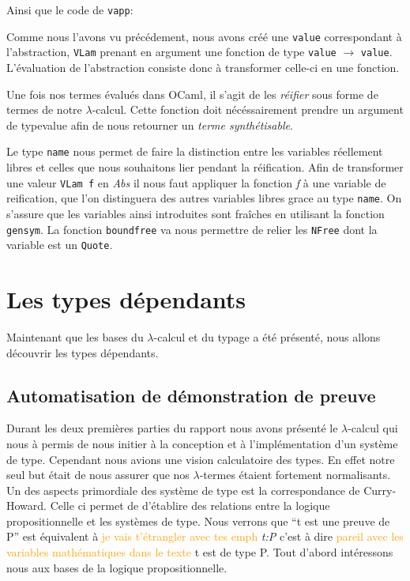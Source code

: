 \documentclass {article}
\newcommand{\codefrom}[3]
           {}
\theoremstyle{definition}
\theoremstyle{remark}
\newcommand{\attention}[1]{\textcolor{orange}{#1}}
\newcommand{\fun}[1]{\lstinline!#1!}
\begin{document}
\codefrom{typed}{lambda}{big_step_eval_exTm_app}
Ainsi que le code de \fun{vapp}: 
\codefrom{typed}{lambda}{vapp}

Comme nous l'avons vu précédement, nous avons créé une \fun{value} correspondant
à l'abstraction, \fun{VLam} prenant en argument une fonction de type \fun{value} $\rightarrow$ \fun{value}.
L'évaluation de l'abstraction consiste donc à transformer celle-ci en une fonction.
\codefrom{typed}{lambda}{big_step_eval_inTm_abs} 

Une fois nos termes évalués dans OCaml, il s'agit de les
\emph{réifier} sous forme de termes de notre
$\lambda$-calcul. Cette fonction doit nécéssairement prendre un argument de
type{value} afin de nous retourner un \emph{terme synthétisable}.

\codefrom{typed}{lambda}{value_to_inTm}
\codefrom{typed}{lambda}{neutral_to_exTm}



Le type \fun{name} nous permet de faire la distinction entre les
variables réellement libres et celles que nous souhaitons lier pendant la réification.
Afin de transformer une valeur \lstinline!VLam f! en
\emph{Abs} il nous faut appliquer la fonction \emph{f} à une variable
de reification, que l'on distinguera des autres variables libres grace au type \fun{name}.
On s'assure que les variables ainsi introduites sont fraîches en utilisant la fonction \fun{gensym}.
La fonction \fun{boundfree} va nous permettre de relier les \fun{NFree} dont la variable est un \fun{Quote}.
\codefrom{typed}{lambda}{boundfree}



\section{Les types dépendants}

Maintenant que les bases du $\lambda$-calcul et du typage a été présenté,
nous allons découvrir les types dépendants. 
 
\subsection{Automatisation de démonstration de preuve}
Durant les deux premières parties du rapport nous avons présenté le $\lambda$-calcul
qui nous à permis de nous initier à la conception et à l'implémentation d'un système de type. Cependant nous avions une vision 
calculatoire des types. En effet notre seul but était de nous assurer que nos $\lambda$-termes
étaient fortement normalisants. 
Un des aspects primordiale des système de type est la correspondance de Curry-Howard.
Celle ci permet de d'établire des relations entre la logique propositionnelle et les systèmes 
de type. Nous verrons que ``t est une preuve de P'' est équivalent à \attention{je vais t'étrangler avec tes emph} \emph{t:P} c'est à dire
\attention{pareil avec les variables mathématiques dans le texte} t est de type P.
Tout d'abord intéressons nous aux bases de la logique propositionnelle.
\end{document}
